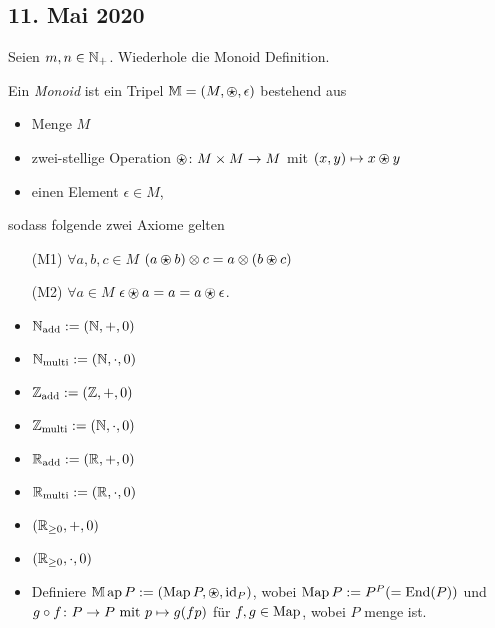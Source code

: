 \subsection*{11. Mai 2020}
Seien $m,n \in \N_+$.
Wiederhole die Monoid Definition.
\begin{definition}[Monoid]
    Ein \emph{Monoid} ist ein Tripel $\M = (M, \ostar, \epsilon)$ bestehend aus
    \begin{itemize}
        \item Menge $M$
        \item zwei-stellige Operation $\ostar \colon M \times M \to M$ mit $(x,y) \mapsto x \ostar y$
        \item einen Element $\epsilon \in M$,
    \end{itemize}
    sodass folgende zwei Axiome gelten
    \begin{enumerate}
        \item[(M1)] $\forall a,b,c \in M$ $(a \ostar b) \otimes c = a \otimes (b \ostar c)$
        \item[(M2)] $\forall a \in M$ $\epsilon \ostar a = a = a \ostar \epsilon$.
    \end{enumerate}
\end{definition}
\begin{example}
    \begin{itemize}
        \item $\N_{\add} := (\N, +, 0)$
        \item $\N_{\multi} := (\N, \cdot, 0)$
        \item $\Z_{\add} := (\Z, +, 0)$
        \item $\Z_{\multi} := (\N, \cdot, 0)$
        \item $\R_{\add} := (\R, +, 0)$
        \item $\R_{\multi} := (\R, \cdot, 0)$
        \item $(\R_{\ge 0}, +, 0)$
        \item $(\R_{\ge 0}, \cdot, 0)$
        \item Definiere $\M\ap P := (\Map P, \ostar, \id_P)$, wobei $\Map P := P^P (= \End(P))$ %
        und $g \circ f \colon P \to P \mit p \mapsto g(fp)$ für $f,g \in \Map$, wobei $P$ menge ist.
    \end{itemize}
\end{example}
